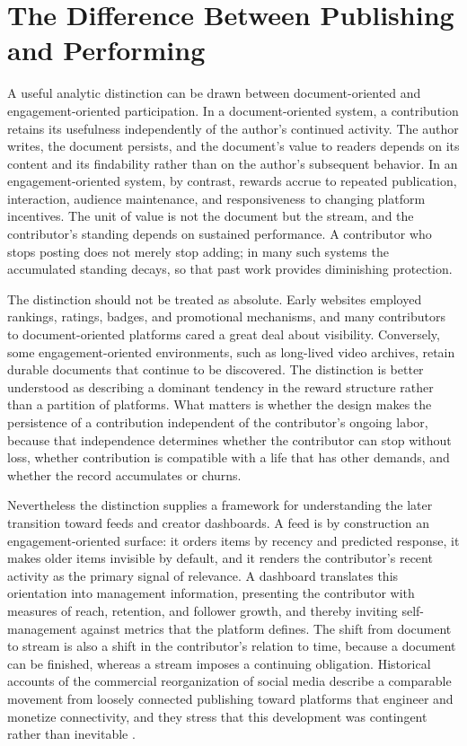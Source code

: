 \documentclass[11pt]{article}
\theoremstyle{remark}
\begin{document}
\section{The Difference Between Publishing and Performing}\label{sec:publishing}

A useful analytic distinction can be drawn between document-oriented and engagement-oriented participation. In a document-oriented system, a contribution retains its usefulness independently of the author's continued activity. The author writes, the document persists, and the document's value to readers depends on its content and its findability rather than on the author's subsequent behavior. In an engagement-oriented system, by contrast, rewards accrue to repeated publication, interaction, audience maintenance, and responsiveness to changing platform incentives. The unit of value is not the document but the stream, and the contributor's standing depends on sustained performance. A contributor who stops posting does not merely stop adding; in many such systems the accumulated standing decays, so that past work provides diminishing protection.

The distinction should not be treated as absolute. Early websites employed rankings, ratings, badges, and promotional mechanisms, and many contributors to document-oriented platforms cared a great deal about visibility. Conversely, some engagement-oriented environments, such as long-lived video archives, retain durable documents that continue to be discovered. The distinction is better understood as describing a dominant tendency in the reward structure rather than a partition of platforms. What matters is whether the design makes the persistence of a contribution independent of the contributor's ongoing labor, because that independence determines whether the contributor can stop without loss, whether contribution is compatible with a life that has other demands, and whether the record accumulates or churns.

Nevertheless the distinction supplies a framework for understanding the later transition toward feeds and creator dashboards. A feed is by construction an engagement-oriented surface: it orders items by recency and predicted response, it makes older items invisible by default, and it renders the contributor's recent activity as the primary signal of relevance. A dashboard translates this orientation into management information, presenting the contributor with measures of reach, retention, and follower growth, and thereby inviting self-management against metrics that the platform defines. The shift from document to stream is also a shift in the contributor's relation to time, because a document can be finished, whereas a stream imposes a continuing obligation. Historical accounts of the commercial reorganization of social media describe a comparable movement from loosely connected publishing toward platforms that engineer and monetize connectivity, and they stress that this development was contingent rather than inevitable \cite{vandijck2013}.
\end{document}
